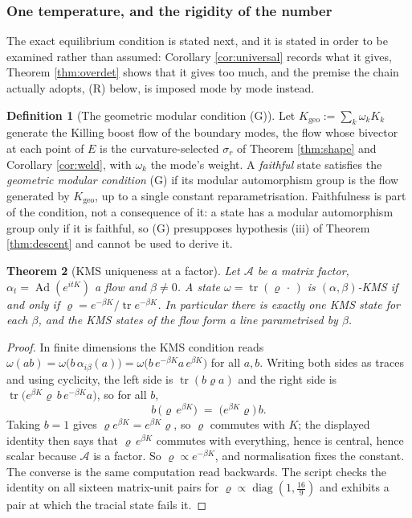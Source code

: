 \documentclass[11pt]{article}
\newtheorem{theorem}{Theorem}[section]
\theoremstyle{definition}
\newtheorem{definition}[theorem]{Definition}
\newcommand{\tr}{\operatorname{tr}}
\newcommand{\Aa}{\mathcal{A}}
\begin{document}
\subsubsection*{One temperature, and the rigidity of the number}

The exact equilibrium condition is stated next, and it is stated in order to be examined rather than assumed: Corollary \ref{cor:universal} records what it gives, Theorem \ref{thm:overdet} shows that it gives too much, and the premise the chain actually adopts, (R) below, is imposed mode by mode instead.

\begin{definition}[The geometric modular condition (G)]\label{def:gmc}
Let $K_{\mathrm{geo}} := \sum_k \omega_k K_k$ generate the Killing boost flow of the boundary modes, the flow whose bivector at each point of $E$ is the curvature-selected $\sigma_r$ of Theorem \ref{thm:shape} and Corollary \ref{cor:weld}, with $\omega_k$ the mode's weight. A \emph{faithful} state satisfies the \emph{geometric modular condition} (G) if its modular automorphism group is the flow generated by $K_{\mathrm{geo}}$, up to a single constant reparametrisation. Faithfulness is part of the condition, not a consequence of it: a state has a modular automorphism group only if it is faithful, so (G) presupposes hypothesis (iii) of Theorem \ref{thm:descent} and cannot be used to derive it.
\end{definition}

\begin{theorem}[KMS uniqueness at a factor]\label{thm:kmsunique}
Let $\Aa$ be a matrix factor, $\alpha_t = \operatorname{Ad}(e^{itK})$ a flow and $\beta \neq 0$. A state $\omega = \tr(\varrho\,\cdot\,)$ is $(\alpha,\beta)$-KMS if and only if $\varrho = e^{-\beta K}/\tr e^{-\beta K}$. In particular there is exactly one KMS state for each $\beta$, and the KMS states of the flow form a line parametrised by $\beta$.
\end{theorem}

\begin{proof}
In finite dimensions the KMS condition reads $\omega(ab) = \omega\bigl(b\,\alpha_{i\beta}(a)\bigr) = \omega\bigl(b\,e^{-\beta K}a\,e^{\beta K}\bigr)$ for all $a, b$. Writing both sides as traces and using cyclicity, the left side is $\tr(b\varrho a)$ and the right side is $\tr\bigl(e^{\beta K}\varrho\, b\, e^{-\beta K} a\bigr)$, so for all $b$,
\[
b\,\bigl(\varrho\, e^{\beta K}\bigr) \;=\; \bigl(e^{\beta K}\varrho\bigr)\, b .
\]
Taking $b = 1$ gives $\varrho e^{\beta K} = e^{\beta K}\varrho$, so $\varrho$ commutes with $K$; the displayed identity then says that $\varrho\,e^{\beta K}$ commutes with everything, hence is central, hence scalar because $\Aa$ is a factor. So $\varrho \propto e^{-\beta K}$, and normalisation fixes the constant. The converse is the same computation read backwards. The script checks the identity on all sixteen matrix-unit pairs for $\varrho \propto \operatorname{diag}(1, \tfrac{16}{9})$ and exhibits a pair at which the tracial state fails it.
\end{proof}
\end{document}
